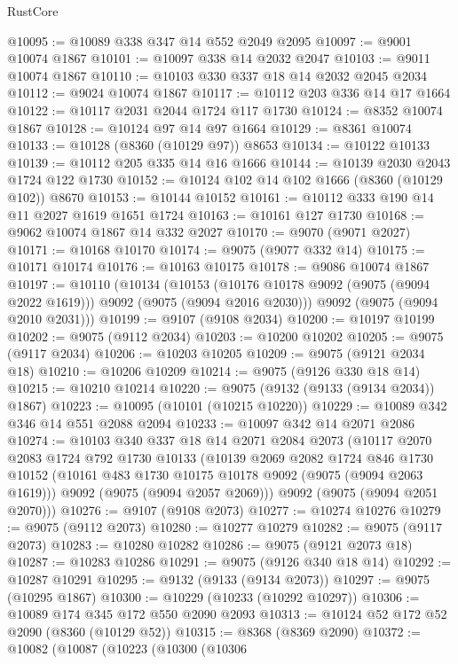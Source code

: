 \begin{lexlean}{RustCore}
\begin{coremodule}
@10095 := @10089 @338 @347 @14 @552 @2049 @2095
@10097 := @9001 @10074 @1867
@10101 := @10097 @338 @14 @2032 @2047
@10103 := @9011 @10074 @1867
@10110 := @10103 @330 @337 @18 @14 @2032 @2045 @2034
@10112 := @9024 @10074 @1867
@10117 := @10112 @203 @336 @14 @17 @1664
@10122 := @10117 @2031 @2044 @1724 @117 @1730
@10124 := @8352 @10074 @1867
@10128 := @10124 @97 @14 @97 @1664
@10129 := @8361 @10074
@10133 := @10128 (@8360 (@10129 @97)) @8653
@10134 := @10122 @10133
@10139 := @10112 @205 @335 @14 @16 @1666
@10144 := @10139 @2030 @2043 @1724 @122 @1730
@10152 := @10124 @102 @14 @102 @1666 (@8360 (@10129 @102)) @8670
@10153 := @10144 @10152
@10161 := @10112 @333 @190 @14 @11 @2027 @1619 @1651 @1724
@10163 := @10161 @127 @1730
@10168 := @9062 @10074 @1867 @14 @332 @2027
@10170 := @9070 (@9071 @2027)
@10171 := @10168 @10170
@10174 := @9075 (@9077 @332 @14)
@10175 := @10171 @10174
@10176 := @10163 @10175
@10178 := @9086 @10074 @1867
@10197 := @10110
    (@10134
      (@10153 (@10176 @10178 @9092 (@9075 (@9094 @2022 @1619))) @9092 (@9075 (@9094 @2016 @2030)))
      @9092
      (@9075 (@9094 @2010 @2031)))
@10199 := @9107 (@9108 @2034)
@10200 := @10197 @10199
@10202 := @9075 (@9112 @2034)
@10203 := @10200 @10202
@10205 := @9075 (@9117 @2034)
@10206 := @10203 @10205
@10209 := @9075 (@9121 @2034 @18)
@10210 := @10206 @10209
@10214 := @9075 (@9126 @330 @18 @14)
@10215 := @10210 @10214
@10220 := @9075 (@9132 (@9133 (@9134 @2034)) @1867)
@10223 := @10095 (@10101 (@10215 @10220))
@10229 := @10089 @342 @346 @14 @551 @2088 @2094
@10233 := @10097 @342 @14 @2071 @2086
@10274 := @10103
    @340
    @337
    @18
    @14
    @2071
    @2084
    @2073
    (@10117
      @2070
      @2083
      @1724
      @792
      @1730
      @10133
      (@10139
        @2069
        @2082
        @1724
        @846
        @1730
        @10152
        (@10161 @483 @1730 @10175 @10178 @9092 (@9075 (@9094 @2063 @1619)))
        @9092
        (@9075 (@9094 @2057 @2069)))
      @9092
      (@9075 (@9094 @2051 @2070)))
@10276 := @9107 (@9108 @2073)
@10277 := @10274 @10276
@10279 := @9075 (@9112 @2073)
@10280 := @10277 @10279
@10282 := @9075 (@9117 @2073)
@10283 := @10280 @10282
@10286 := @9075 (@9121 @2073 @18)
@10287 := @10283 @10286
@10291 := @9075 (@9126 @340 @18 @14)
@10292 := @10287 @10291
@10295 := @9132 (@9133 (@9134 @2073))
@10297 := @9075 (@10295 @1867)
@10300 := @10229 (@10233 (@10292 @10297))
@10306 := @10089 @174 @345 @172 @550 @2090 @2093
@10313 := @10124 @52 @172 @52 @2090 (@8360 (@10129 @52))
@10315 := @8368 (@8369 @2090)
@10372 := @10082
    (@10087
      (@10223
        (@10300
          (@10306

\end{coremodule}
\end{lexlean}
